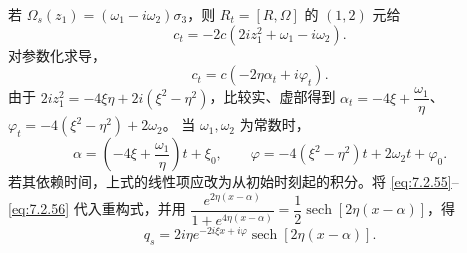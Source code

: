 \documentclass[lang=cn,scheme=chinese,mode=simple,device=normal,color=blue,math=cm,thmcnt=section,12pt]{elegantbook}
\newcommand{\eqq}[2]{\tag{#1}\label{eq:#1}#2}
\DeclareMathOperator{\sech}{sech}
\begin{document}
若 $\Omega_s(z_1)=(\omega_1-i\omega_2)\sigma_3$，则 $R_t=[R,\Omega]$ 的 $(1,2)$ 元给
\begin{equation}
\eqq{7.2.57}{c_t=-2c(2iz_1^2+\omega_1-i\omega_2).}
\end{equation}
对参数化求导，
\begin{equation}
\eqq{7.2.58}{c_t=c(-2\eta\alpha_t+i\varphi_t).}
\end{equation}
由于 $2iz_1^2=-4\xi\eta+2i(\xi^2-\eta^2)$，比较实、虚部得到
$\alpha_t=-4\xi+\dfrac{\omega_1}{\eta}$、$\varphi_t=-4(\xi^2-\eta^2)+2\omega_2$。
当 $\omega_1,\omega_2$ 为常数时，
\begin{equation}
\eqq{7.2.59}{\alpha=\left(-4\xi+\dfrac{\omega_1}{\eta}\right)t+\xi_0,
\qquad \varphi=-4(\xi^2-\eta^2)t+2\omega_2t+\varphi_0.}
\end{equation}
若其依赖时间，上式的线性项应改为从初始时刻起的积分。将 \eqref{eq:7.2.55}--\eqref{eq:7.2.56} 代入重构式，并用
$\dfrac{e^{2\eta(x-\alpha)}}{1+e^{4\eta(x-\alpha)}}=\dfrac{1}{2}\sech[2\eta(x-\alpha)]$，得
\begin{equation}
\eqq{7.2.60}{q_s=2i\eta e^{-2i\xi x+i\varphi}\sech[2\eta(x-\alpha)].}
\end{equation}
\end{document}
